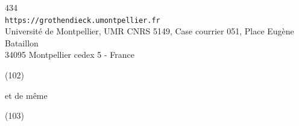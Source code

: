 \begin{center}
{\small
434\\
\texttt{https://grothendieck.umontpellier.fr}\\
Université de Montpellier, UMR CNRS 5149, Case courrier 051, Place Eugène Bataillon\\
34095 Montpellier cedex 5 - France
}
\end{center}


\noindent(102)

et de même

\noindent(103)


